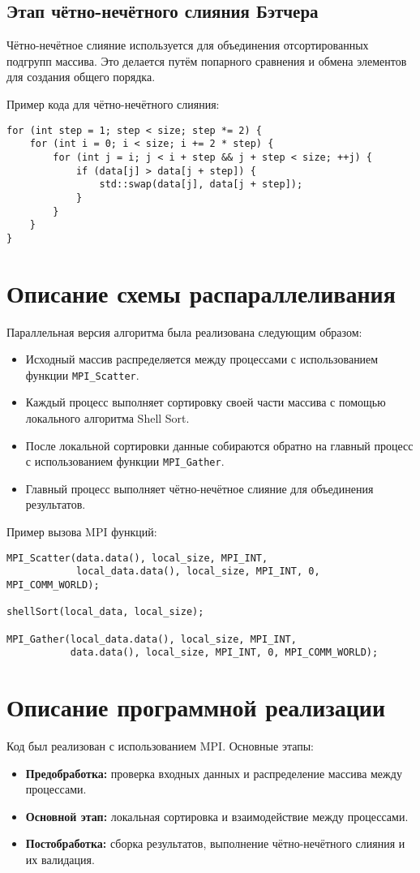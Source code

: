 \documentclass[a4paper,12pt]{article}
\begin{document}
\subsection{Этап чётно-нечётного слияния Бэтчера}
Чётно-нечётное слияние используется для объединения отсортированных подгрупп массива. Это делается путём попарного сравнения и обмена элементов для создания общего порядка.

Пример кода для чётно-нечётного слияния:
\begin{lstlisting}
for (int step = 1; step < size; step *= 2) {
    for (int i = 0; i < size; i += 2 * step) {
        for (int j = i; j < i + step && j + step < size; ++j) {
            if (data[j] > data[j + step]) {
                std::swap(data[j], data[j + step]);
            }
        }
    }
}
\end{lstlisting}

\section{Описание схемы распараллеливания}
Параллельная версия алгоритма была реализована следующим образом:
\begin{itemize}
    \item Исходный массив распределяется между процессами с использованием функции \texttt{MPI\_Scatter}.
    \item Каждый процесс выполняет сортировку своей части массива с помощью локального алгоритма Shell Sort.
    \item После локальной сортировки данные собираются обратно на главный процесс с использованием функции \texttt{MPI\_Gather}.
    \item Главный процесс выполняет чётно-нечётное слияние для объединения результатов.
\end{itemize}

Пример вызова MPI функций:
\begin{lstlisting}
MPI_Scatter(data.data(), local_size, MPI_INT, 
            local_data.data(), local_size, MPI_INT, 0, MPI_COMM_WORLD);

shellSort(local_data, local_size);

MPI_Gather(local_data.data(), local_size, MPI_INT, 
           data.data(), local_size, MPI_INT, 0, MPI_COMM_WORLD);
\end{lstlisting}

\section{Описание программной реализации}
Код был реализован с использованием MPI. Основные этапы:
\begin{itemize}
    \item \textbf{Предобработка:} проверка входных данных и распределение массива между процессами.
    \item \textbf{Основной этап:} локальная сортировка и взаимодействие между процессами.
    \item \textbf{Постобработка:} сборка результатов, выполнение чётно-нечётного слияния и их валидация.
\end{itemize}
\end{document}
